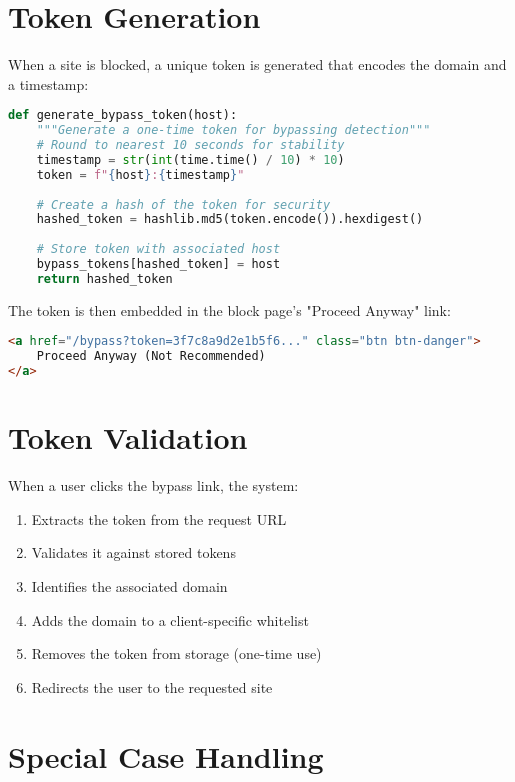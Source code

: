 \section{Token Generation}

When a site is blocked, a unique token is generated that encodes the domain and a timestamp:

\begin{lstlisting}[language=Python, caption=Token Generation]
def generate_bypass_token(host):
    """Generate a one-time token for bypassing detection"""
    # Round to nearest 10 seconds for stability
    timestamp = str(int(time.time() / 10) * 10)
    token = f"{host}:{timestamp}"
    
    # Create a hash of the token for security
    hashed_token = hashlib.md5(token.encode()).hexdigest()
    
    # Store token with associated host
    bypass_tokens[hashed_token] = host
    return hashed_token
\end{lstlisting}

The token is then embedded in the block page's "Proceed Anyway" link:

\begin{lstlisting}[language=HTML]
<a href="/bypass?token=3f7c8a9d2e1b5f6..." class="btn btn-danger">
    Proceed Anyway (Not Recommended)
</a>
\end{lstlisting}

\section{Token Validation}

When a user clicks the bypass link, the system:
\begin{enumerate}
    \item Extracts the token from the request URL
    \item Validates it against stored tokens
    \item Identifies the associated domain
    \item Adds the domain to a client-specific whitelist
    \item Removes the token from storage (one-time use)
    \item Redirects the user to the requested site
\end{enumerate}

\section{Special Case Handling}

